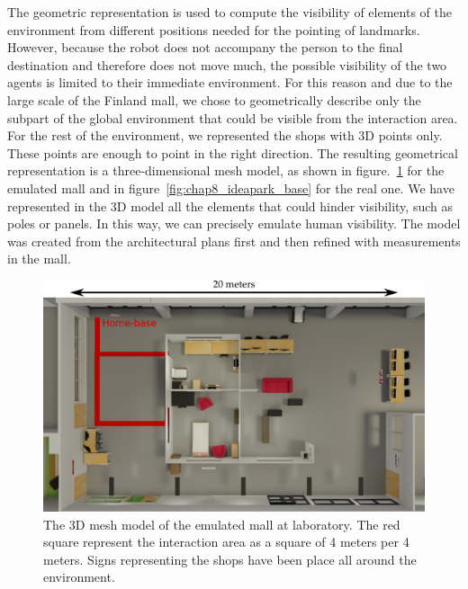 The geometric representation is used to compute the visibility of elements of the environment from different positions needed for the pointing of landmarks. However, because the robot does not accompany the person to the final destination and therefore does not move much, the possible visibility of the two agents is limited to their immediate environment. For this reason and due to the large scale of the Finland mall, we chose to geometrically describe only the subpart of the global environment that could be visible from the interaction area. For the rest of the environment, we represented the shops with 3D points only. These points are enough to point in the right direction. The resulting geometrical representation is a three-dimensional mesh model, as shown in figure.~\ref{fig:chap8_adream_base} for the emulated mall and in figure~\ref{fig:chap8_ideapark_base} for the real one. We have represented in the 3D model all the elements that could hinder visibility, such as poles or panels. In this way, we can precisely emulate human visibility. The model was created from the architectural plans first and then refined with measurements in the mall.

\begin{figure}[ht!]
\centering
\includegraphics[scale=0.15]{figures/chapter8/adream_base_m.png}
\caption{\label{fig:chap8_adream_base} The 3D mesh model of the emulated mall at laboratory. The red square represent the interaction area as a square of 4 meters per 4 meters. Signs representing the shops have been place all around the environment. }
\end{figure}

